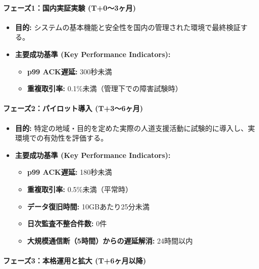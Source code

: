 \documentclass[
  a4paper,
  ja=standard,
  xelatex]{bxjsarticle}
\begin{document}
\paragraph{\texorpdfstring{\textbf{フェーズ1：国内実証実験
(T+0～3ヶ月)}}{フェーズ1：国内実証実験 (T+0～3ヶ月)}}\label{ux30d5ux30a7ux30fcux30ba1ux56fdux5185ux5b9fux8a3cux5b9fux9a13-t03ux30f6ux6708}

\begin{itemize}
\item
  \textbf{目的:}
  システムの基本機能と安全性を国内の管理された環境で最終検証する。
\item
  \textbf{主要成功基準 (Key Performance Indicators):}

  \begin{itemize}
  \item
    \textbf{p99 ACK遅延:} 300秒未満
  \item
    \textbf{重複取引率:} 0.1\%未満（管理下での障害試験時）
  \end{itemize}
\end{itemize}

\paragraph{\texorpdfstring{\textbf{フェーズ2：パイロット導入
(T+3～6ヶ月)}}{フェーズ2：パイロット導入 (T+3～6ヶ月)}}\label{ux30d5ux30a7ux30fcux30ba2ux30d1ux30a4ux30edux30c3ux30c8ux5c0eux5165-t36ux30f6ux6708}

\begin{itemize}
\item
  \textbf{目的:}
  特定の地域・目的を定めた実際の人道支援活動に試験的に導入し、実環境での有効性を評価する。
\item
  \textbf{主要成功基準 (Key Performance Indicators):}

  \begin{itemize}
  \item
    \textbf{p99 ACK遅延:} 180秒未満
  \item
    \textbf{重複取引率:} 0.5\%未満（平常時）
  \item
    \textbf{データ復旧時間:} 10GBあたり25分未満
  \item
    \textbf{日次監査不整合件数:} 0件
  \item
    \textbf{大規模通信断（5時間）からの遅延解消:} 24時間以内
  \end{itemize}
\end{itemize}

\paragraph{\texorpdfstring{\textbf{フェーズ3：本格運用と拡大
(T+6ヶ月以降)}}{フェーズ3：本格運用と拡大 (T+6ヶ月以降)}}\label{ux30d5ux30a7ux30fcux30ba3ux672cux683cux904bux7528ux3068ux62e1ux5927-t6ux30f6ux6708ux4ee5ux964d}
\end{document}
